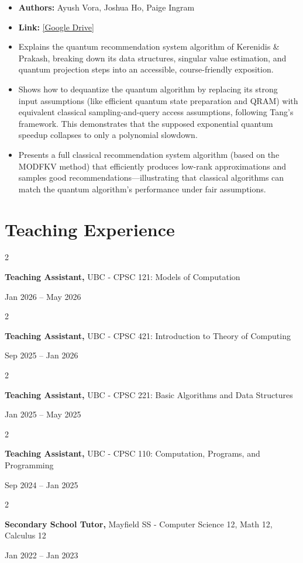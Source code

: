 \documentclass[10pt, letterpaper]{article}
\newenvironment{highlights}{
    \begin{itemize}[
        topsep=0.10 cm,
        parsep=0.10 cm,
        partopsep=0pt,
        itemsep=0pt,
        leftmargin=0 cm + 10pt
    ]
}{
    \end{itemize}
} %
\newenvironment{twocolentry}[2][]{
    \onecolentry
    \def\secondColumn{#2}
    \setcolumnwidth{\fill, 4.5 cm}
    \begin{paracol}{2}
}{
    \switchcolumn \raggedleft \secondColumn
    \end{paracol}
    \endonecolentry
} %
\begin{document}
    \begin{highlights}
        \item \textbf{Authors:} Ayush Vora, Joshua Ho, Paige Ingram
        \item \textbf{Link:} \href{https://drive.google.com/file/d/1Pq-bbs979KGIRotfqBK7qK1oonJdizlU/view?usp=drive_link}{[Google Drive]}
        \item Explains the quantum recommendation system algorithm of Kerenidis \& Prakash, breaking down its data structures, singular value estimation, and quantum projection steps into an accessible, course-friendly exposition. 
        \item Shows how to dequantize the quantum algorithm by replacing its strong input assumptions (like efficient quantum state preparation and QRAM) with equivalent classical sampling-and-query access assumptions, following Tang’s framework. This demonstrates that the supposed exponential quantum speedup collapses to only a polynomial slowdown. 
        \item Presents a full classical recommendation system algorithm (based on the MODFKV method) that efficiently produces low-rank approximations and samples good recommendations—illustrating that classical algorithms can match the quantum algorithm’s performance under fair assumptions. 
    \end{highlights}


    \section{Teaching Experience}
    \begin{twocolentry}{Jan 2026 – May 2026}
        \textbf{Teaching Assistant,} UBC - CPSC 121: Models of Computation
    \end{twocolentry}
    \vspace{0.10 cm}
    \begin{twocolentry}{Sep 2025 – Jan 2026}
        \textbf{Teaching Assistant,} UBC - CPSC 421: Introduction to Theory of Computing
    \end{twocolentry}
    \vspace{0.10 cm}
    \begin{twocolentry}{Jan 2025 – May 2025}
        \textbf{Teaching Assistant,} UBC - CPSC 221: Basic Algorithms and Data Structures
    \end{twocolentry}
    \vspace{0.10 cm}
    \begin{twocolentry}{Sep 2024 – Jan 2025}
        \textbf{Teaching Assistant,} UBC - CPSC 110: Computation, Programs, and Programming
    \end{twocolentry}
    \vspace{0.10 cm}
    \begin{twocolentry}{Jan 2022 – Jan 2023}
        \textbf{Secondary School Tutor,} Mayfield SS - Computer Science 12, Math 12, Calculus 12
    \end{twocolentry}
\end{document}
